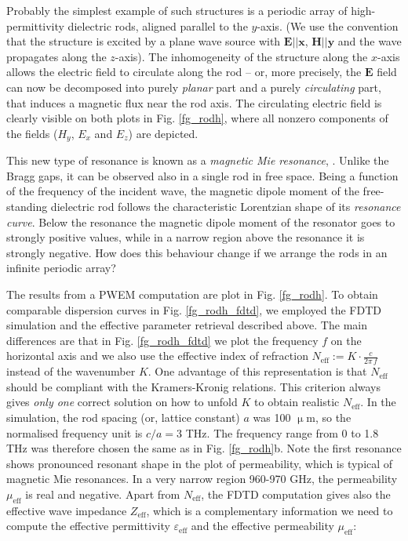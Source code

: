 {Probably the simplest example of such structures is a periodic array of high-permittivity dielectric rods, aligned parallel to the $y$-axis. (We use the convention that the structure is excited by a plane wave source with $\mathbf E || \mathbf x$, $\mathbf H || \mathbf y$ and the wave propagates along the $z$-axis). %
The inhomogeneity of the structure along the $x$-axis allows the electric field to circulate along the rod -- or, more precisely, the $\mathbf E$ field can now be decomposed into purely \textit{planar} part and a purely \textit{circulating} part, that induces a magnetic flux near the rod axis. The circulating electric field is clearly visible on both plots in Fig. \ref{fg_rodh}, where all nonzero components of the fields ($H_y$, $E_x$ and $E_z$) are depicted. 

This new type of resonance is known as a \textit{magnetic Mie resonance}, \cite{obrien2002photonic, nemec2009tunable, yahiaoui2009broadband, yahiaoui2011tunable}. Unlike the Bragg gaps, it can be observed also in a single rod in free space. Being a function of the frequency of the incident wave, the magnetic dipole moment of the free-standing dielectric rod follows the characteristic Lorentzian shape of its \textit{resonance curve}. Below the resonance the magnetic dipole moment of the resonator goes to strongly positive values, while in a narrow region above the resonance it is strongly negative. How does this behaviour change if we arrange the rods in an infinite periodic array? 


The results from a PWEM computation are plot in Fig. \ref{fg_rodh}. To obtain comparable dispersion curves in Fig. \ref{fg_rodh_fdtd}, we employed the FDTD simulation and the effective parameter retrieval described above. The main differences are that in Fig. \ref{fg_rodh_fdtd} we plot the frequency $f$ on the horizontal axis and we also use the effective index of refraction $N_{\text{eff}} := K\cdot \frac{c}{2\pi\,f}$ instead of the wavenumber $K$. One advantage of this representation is that $N_{\text{eff}}$ should be compliant with the Kramers-Kronig relations. This criterion always gives \textit{only one} correct solution on how to unfold $K$ to obtain realistic $N_{\text{eff}}$. 
In the simulation, the rod spacing (or, lattice constant) $a$ was 100 $\upmu$m, so the normalised frequency unit is $c/a = 3$ THz. The frequency range from 0 to 1.8 THz was therefore chosen the same as in Fig. \ref{fg_rodh}b. 
Note the first resonance shows pronounced resonant shape in the plot of permeability, which is typical of magnetic Mie resonances. In a very narrow region 960-970 GHz, the permeability $\mu_{\text{eff}}$ is real and negative. 
Apart from $N_{\text{eff}}$, the FDTD computation gives also the effective wave impedance $Z_{\text{eff}}$, which is a complementary information we need to compute the effective permittivity $\varepsilon_{\text{eff}}$ and the effective permeability $\mu_{\text{eff}}$:

}
